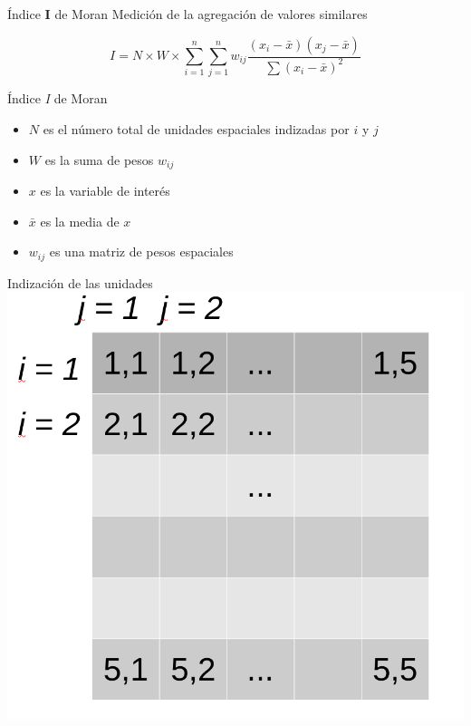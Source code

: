 \documentclass[
  11pt,
  ignorenonframetext,
]{beamer}
\providecommand{\tightlist}{%
  \setlength{\itemsep}{0pt}\setlength{\parskip}{0pt}}
\begin{document}
\begin{frame}{Índice \textbf{I} de Moran}
\protect\hypertarget{uxedndice-i-de-moran}{}
Medición de la agregación de valores similares

\begin{equation}
    I = N \times W \times \sum_{i = 1}^n \sum_{j = 1}^n w_{ij} \frac{(x_i - \bar{x})(x_j - \bar{x})}{\sum (x_i - \bar{x})^2}
\end{equation}
\end{frame}

\begin{frame}{Índice \emph{I} de Moran}
\protect\hypertarget{uxedndice-i-de-moran-1}{}
\begin{itemize}
\tightlist
\item
  \(N\) es el número total de unidades espaciales indizadas por \(i\) y
  \(j\)
\item
  \(W\) es la suma de pesos \(w_{ij}\)
\item
  \(x\) es la variable de interés
\item
  \(\bar{x}\) es la media de \(x\)
\item
  \(w_{ij}\) es una matriz de pesos espaciales
\end{itemize}
\end{frame}

\begin{frame}{Indización de las unidades}
\protect\hypertarget{indizaciuxf3n-de-las-unidades}{}
\includegraphics{Asociacion-imagenes/indizacion.png}
\end{frame}
\end{document}

